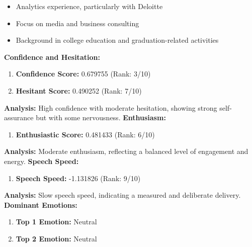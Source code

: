 \documentclass{article}
\begin{document}
\begin{itemize}
    \item Analytics experience, particularly with Deloitte
    \item Focus on media and business consulting
    \item Background in college education and graduation-related activities
\end{itemize}
\vspace{0.1in}
\large{\textbf{Confidence and Hesitation:}}
\begin{tcolorbox}[ colback=purple!5!white,colframe=purple!75!black,  title=Confidence and Hesitant Scores]
    \begin{enumerate}
        \item \textbf{Confidence Score:} \textcolor{green!50!black}{0.679755} (Rank: 3/10)
        \item \textbf{Hesitant Score:} \textcolor{red!70!black}{0.490252} (Rank: 7/10)
    \end{enumerate}
\end{tcolorbox}
    \textbf{Analysis:} High confidence with moderate hesitation, showing strong self-assurance but with some nervousness.
    \vspace{0.1in}
\large{\textbf{Enthusiasm:}}
\begin{tcolorbox}[colback=red!5!white,colframe=red!75!black,title=Enthusiastic Score]
    \begin{enumerate}
        \item \textbf{Enthusiastic Score:} \textcolor{orange!70!black}{0.481433} (Rank: 6/10)
    \end{enumerate}
\end{tcolorbox}
    \textbf{Analysis:} Moderate enthusiasm, reflecting a balanced level of engagement and energy.
    \vspace{0.1in}
\large{\textbf{Speech Speed:}}
\begin{tcolorbox}[colback=cyan!5!white,colframe=cyan!75!black,title=Speech Speed]
    \begin{enumerate}
        \item \textbf{Speech Speed:} \textcolor{purple!70!black}{-1.131826} (Rank: 9/10)
    \end{enumerate}
\end{tcolorbox}
    \textbf{Analysis:} Slow speech speed, indicating a measured and deliberate delivery.
    \vspace{0.1in}
\large{\textbf{Dominant Emotions:}}
\begin{tcolorbox}[title=Emotional State]
    \begin{enumerate}
        \item \textbf{Top 1 Emotion:} \textcolor{blue!80!black}{Neutral}
        \item \textbf{Top 2 Emotion:} \textcolor{red!80!black}{Neutral}
    \end{enumerate}
\end{tcolorbox}
\end{document}
